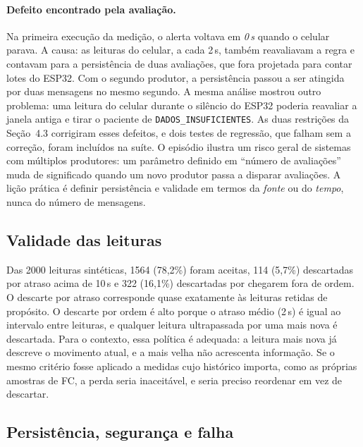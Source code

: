 \documentclass[12pt,a4paper]{article}
\begin{document}
\paragraph{Defeito encontrado pela avaliação.}
Na primeira execução da medição, o alerta voltava em \emph{0\,s} quando o celular parava.
A causa: as leituras do celular, a cada 2\,s, também reavaliavam a regra e contavam para a persistência de duas avaliações, que fora projetada para contar lotes do ESP32.
Com o segundo produtor, a persistência passou a ser atingida por duas mensagens no mesmo segundo.
A mesma análise mostrou outro problema: uma leitura do celular durante o silêncio do ESP32 poderia reavaliar a janela antiga e tirar o paciente de \texttt{DADOS\_INSUFICIENTES}.
As duas restrições da Seção~4.3 corrigiram esses defeitos, e dois testes de regressão, que falham sem a correção, foram incluídos na suíte.
O episódio ilustra um risco geral de sistemas com múltiplos produtores: um parâmetro definido em ``número de avaliações'' muda de significado quando um novo produtor passa a disparar avaliações.
A lição prática é definir persistência e validade em termos da \emph{fonte} ou do \emph{tempo}, nunca do número de mensagens.

\subsection{Validade das leituras}

Das 2000 leituras sintéticas, 1564 (78,2\%) foram aceitas, 114 (5,7\%) descartadas por atraso acima de 10\,s e 322 (16,1\%) descartadas por chegarem fora de ordem.
O descarte por atraso corresponde quase exatamente às leituras retidas de propósito.
O descarte por ordem é alto porque o atraso médio (2\,s) é igual ao intervalo entre leituras, e qualquer leitura ultrapassada por uma mais nova é descartada.
Para o contexto, essa política é adequada: a leitura mais nova já descreve o movimento atual, e a mais velha não acrescenta informação.
Se o mesmo critério fosse aplicado a medidas cujo histórico importa, como as próprias amostras de FC, a perda seria inaceitável, e seria preciso reordenar em vez de descartar.

\subsection{Persistência, segurança e falha}
\end{document}
